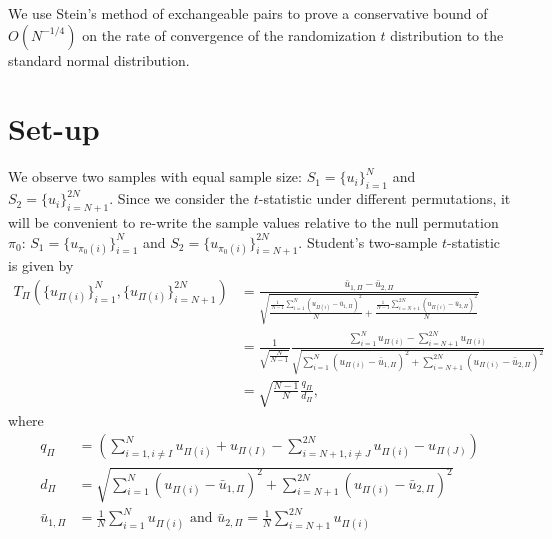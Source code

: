 We use Stein's method of exchangeable pairs to prove a conservative bound of $O(N^{-1/4})$ on the
rate of convergence of the randomization $t$ distribution to the standard normal distribution.

\section{Set-up}
We observe two samples with equal sample size: $S_1 = \{u_i\}_{i=1}^N$ and $S_2 =
\{u_i\}_{i=N+1}^{2N}$.  Since we consider the $t$-statistic under different permutations, it will be
convenient to re-write the sample values relative to the null permutation $\pi_0$: $S_1 =
\{u_{\pi_0(i)}\}_{i=1}^N$ and $S_2 = \{u_{\pi_0(i)}\}_{i=N+1}^{2N}$.
Student's two-sample $t$-statistic is given by
\begin{align*}
T_{\Pi}(\{u_{\Pi(i)}\}_{i=1}^N, \{u_{\Pi(i)}\}_{i=N+1}^{2N}) 
&= \frac{\bar{u}_{1,\Pi} - \bar{u}_{2,\Pi}}{\sqrt{\frac{\frac{1}{N-1}
      \sum_{i=1}^N(u_{\Pi(i)} - \bar{u}_{1,\Pi})^2}{N} + \frac{\frac{1}{N-1}
      \sum_{i=N+1}^{2N}(u_{\Pi(i)} - \bar{u}_{2,\Pi})^2}{N}}} \\
&= \frac{1}{\sqrt{\frac{N}{N-1}}} \frac{\sum_{i=1}^N u_{\Pi(i)} -
  \sum_{i=N+1}^{2N}u_{\Pi(i)}}{\sqrt{\sum_{i=1}^N(u_{\Pi(i)} - 
    \bar{u}_{1,\Pi})^2 + \sum_{i=N+1}^{2N}(u_{\Pi(i)} - \bar{u}_{2,\Pi})^2}} \\
&= \sqrt{\frac{N-1}{N}}\frac{q_\Pi}{d_\Pi},
\end{align*}
where
\begin{align*}
  q_\Pi &= \left (\sum_{i=1, i\neq I}^N u_{\Pi(i)} + u_{\Pi(I)} -
    \sum_{i=N+1, i\neq J}^{2N}u_{\Pi(i)} - u_{\Pi(J)}\right ) \\
  d_\Pi &= \sqrt{\sum_{i=1}^N(u_{\Pi(i)} - \bar{u}_{1,\Pi})^2 +
    \sum_{i=N+1}^{2N}(u_{\Pi(i)} - \bar{u}_{2,\Pi})^2} \\
  \bar{u}_{1,\Pi} &= \frac{1}{N} \sum_{i=1}^N u_{\Pi(i)} \text{ and } 
  \bar{u}_{2,\Pi} = \frac{1}{N} \sum_{i=N+1}^{2N} u_{\Pi(i)}
\end{align*}

